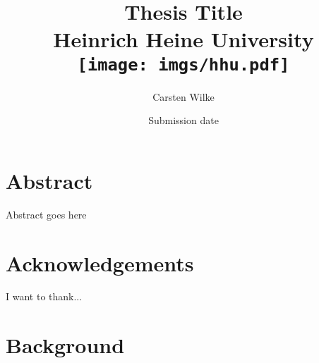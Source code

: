 \documentclass{report}
\title{
{Thesis Title}\\
{\large Heinrich Heine University}\\
{\texttt{[image: imgs/hhu.pdf]}}
}
\author{Carsten Wilke}
\date{Submission date}
\begin{document}
\maketitle

\chapter*{Abstract}
Abstract goes here

\chapter*{Acknowledgements}
I want to thank...

\tableofcontents

\chapter{Background}




\end{document}
